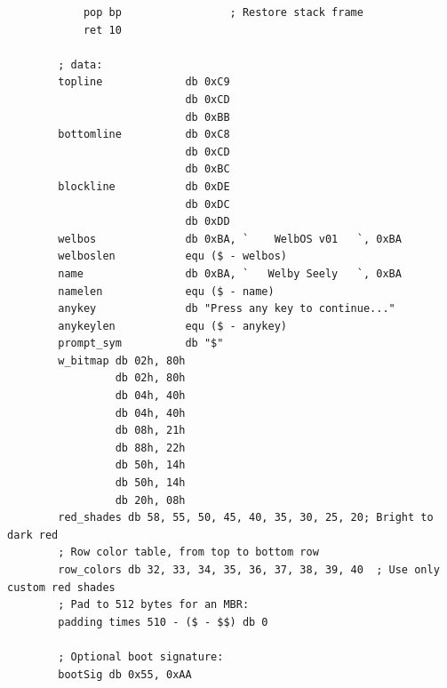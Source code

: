 \documentclass{article}
\begin{document}
\begin{lstlisting}
            pop bp                 ; Restore stack frame
            ret 10

        ; data:
        topline             db 0xC9
                            db 0xCD
                            db 0xBB
        bottomline          db 0xC8
                            db 0xCD
                            db 0xBC
        blockline           db 0xDE
                            db 0xDC
                            db 0xDD
        welbos              db 0xBA, `    WelbOS v01   `, 0xBA
        welboslen           equ ($ - welbos)
        name                db 0xBA, `   Welby Seely   `, 0xBA
        namelen             equ ($ - name)
        anykey              db "Press any key to continue..."
        anykeylen           equ ($ - anykey)
        prompt_sym          db "$"
        w_bitmap db 02h, 80h
                 db 02h, 80h
                 db 04h, 40h
                 db 04h, 40h
                 db 08h, 21h
                 db 88h, 22h
                 db 50h, 14h
                 db 50h, 14h
                 db 20h, 08h
        red_shades db 58, 55, 50, 45, 40, 35, 30, 25, 20; Bright to dark red
        ; Row color table, from top to bottom row
        row_colors db 32, 33, 34, 35, 36, 37, 38, 39, 40  ; Use only custom red shades
        ; Pad to 512 bytes for an MBR:
        padding times 510 - ($ - $$) db 0

        ; Optional boot signature:
        bootSig db 0x55, 0xAA
    \end{lstlisting}
\end{document}
